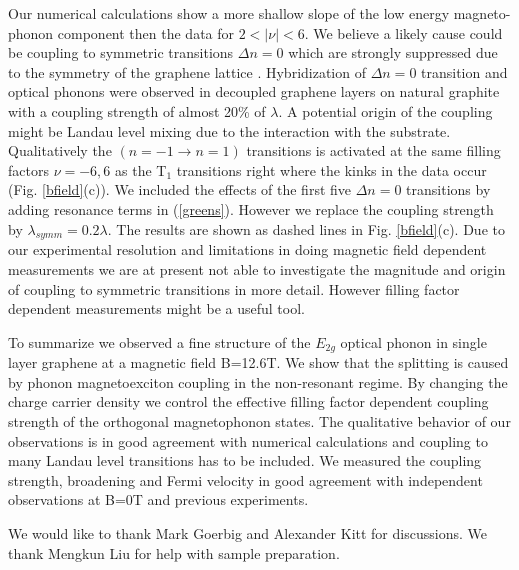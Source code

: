 \documentclass[prl,aps,superscriptaddress,showpacs,reprint]{revtex4-1}
\begin{document}
Our numerical calculations show a more shallow slope of the low energy magneto-phonon component then the data for $2 < \left|\nu\right| < 6$. We believe a likely cause could be coupling to symmetric transitions $\Delta n = 0$ which are strongly suppressed due to the symmetry of the graphene lattice \cite{PhysRevB.84.235138}. Hybridization of $\Delta n =0$ transition and optical phonons were observed in decoupled graphene layers on natural graphite \cite{faugeras2011magneto,kuhne2012polarization} with a coupling strength of almost 20\% of $\lambda$. A potential origin of the coupling might be Landau level mixing due to the interaction with the substrate. Qualitatively the $(n=-1 \rightarrow n=1)$ transitions is activated at the same filling factors $\nu=-6,6$ as the T$_1$ transitions right where the kinks in the data occur (Fig. \ref{bfield}(c)). We included the effects of the first five $\Delta n = 0$ transitions by adding resonance terms in (\ref{greens}). However we replace the coupling strength by $\lambda_{symm} =0.2\lambda$. The results are shown as dashed lines in Fig. \ref{bfield}(c). Due to our experimental resolution and limitations in doing magnetic field dependent measurements we are at present not able to investigate the magnitude and origin of coupling to symmetric transitions in more detail. However filling factor dependent measurements might be a useful tool.

To summarize we observed a fine structure of the $E_{2g}$ optical phonon in single layer graphene at a magnetic field B=12.6T. We show that the splitting is caused by phonon magnetoexciton coupling in the non-resonant regime. By changing the charge carrier density we control the effective filling factor dependent coupling strength of the orthogonal magnetophonon states. The qualitative behavior of our observations is in good agreement with numerical calculations and coupling to many Landau level transitions has to be included. We measured the coupling strength, broadening and Fermi velocity in good agreement with independent observations at B=0T and previous experiments.
\\

\begin{acknowledgments}
We would like to thank Mark Goerbig and Alexander Kitt for discussions. We thank Mengkun Liu for help with sample preparation.
\end{acknowledgments}



\end{document}

